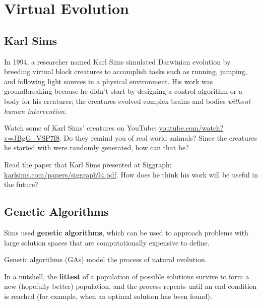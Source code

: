 \newcommand{\TODO}{\hl{\emph{TODO:}}\hl}

\chapter{Virtual Evolution}

\section{Karl Sims}

In 1994, a researcher named Karl Sims simulated Darwinian evolution by breeding 
virtual block creatures to accomplish tasks such as running, jumping, and following 
light sources in a physical environment. His work was groundbreaking because he didn't 
start by designing a control algorithm or a body for his creatures; the creatures 
evolved complex brains and bodies {\em without human intervention}. 

\begin{ex}
  Watch some of Karl Sims' creatures on YouTube:
  \url{youtube.com/watch?v=JBgG_VSP7f8}. Do they remind you of real world
  animals? Since the creatures he started with were randomly generated, how can that be?
\end{ex}

\begin{ex}
  Read the paper that Karl Sims presented at Siggraph:
  \url{karlsims.com/papers/siggraph94.pdf}. How does he think his
  work will be useful in the future?
\end{ex}

\section{Genetic Algorithms}

Sims used {\bf genetic algorithms}, which can be used to approach problems 
with large solution spaces that are computationally expensive to define.

Genetic algorithms (GAs) model the process of 
natural evolution. 


In a nutshell, the {\bf fittest} of a population of possible 
solutions survive to form a new (hopefully better) population, and the process
repeats until an end condition is reached (for example, when an optimal
solution has been found). 

